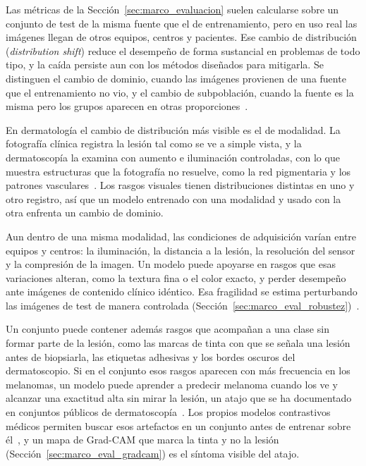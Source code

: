 Las métricas de la Sección~\ref{sec:marco_evaluacion} suelen calcularse sobre un conjunto de test de la misma
fuente que el de entrenamiento, pero en uso real las imágenes llegan de otros equipos, centros y pacientes.
Ese cambio de distribución (\emph{distribution shift}) reduce el desempeño de forma sustancial en problemas de
todo tipo, y la caída persiste aun con los métodos diseñados para mitigarla. Se distinguen el cambio de
dominio, cuando las imágenes provienen de una fuente que el entrenamiento no vio, y el cambio de
subpoblación, cuando la fuente es la misma pero los grupos aparecen en otras
proporciones~\cite{koh2021wilds}.

En dermatología el cambio de distribución más visible es el de modalidad. La fotografía clínica registra la
lesión tal como se ve a simple vista, y la dermatoscopía la examina con aumento e iluminación controladas, con
lo que muestra estructuras que la fotografía no resuelve, como la red pigmentaria y los patrones
vasculares~\cite{dinnes2018dermoscopy,kittler2016standardization}. Los rasgos visuales tienen distribuciones
distintas en uno y otro registro, así que un modelo entrenado con una modalidad y usado con la otra enfrenta
un cambio de dominio.

Aun dentro de una misma modalidad, las condiciones de adquisición varían entre equipos y centros: la
iluminación, la distancia a la lesión, la resolución del sensor y la compresión de la imagen. Un modelo puede
apoyarse en rasgos que esas variaciones alteran, como la textura fina o el color exacto, y perder desempeño
ante imágenes de contenido clínico idéntico. Esa fragilidad se estima perturbando las imágenes de test de
manera controlada (Sección~\ref{sec:marco_eval_robustez})~\cite{hendrycks2019benchmarking}.

Un conjunto puede contener además rasgos que acompañan a una clase sin formar parte de la lesión, como las
marcas de tinta con que se señala una lesión antes de biopsiarla, las etiquetas adhesivas y los bordes oscuros
del dermatoscopio. Si en el conjunto esos rasgos aparecen con más frecuencia en los melanomas, un modelo puede
aprender a predecir melanoma cuando los ve y alcanzar una exactitud alta sin mirar la lesión, un atajo que se
ha documentado en conjuntos públicos de dermatoscopía~\cite{yan2023towards}. Los propios modelos contrastivos
médicos permiten buscar esos artefactos en un conjunto antes de entrenar sobre él~\cite{kim2024transparent}, y
un mapa de Grad-CAM que marca la tinta y no la lesión (Sección~\ref{sec:marco_eval_gradcam}) es el síntoma
visible del atajo.

